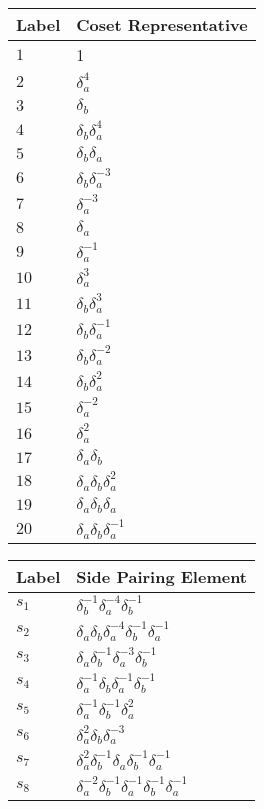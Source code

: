 \documentclass{article}
\begin{document}
\begin{center}
\begin{tabular}{ll}
\toprule
Label & Coset Representative\\
\midrule
$1$ & 1 \\
$2$ & $\delta_a^{4}$ \\
$3$ & $\delta_b^{}$ \\
$4$ & $\delta_b^{}\delta_a^{4}$ \\
$5$ & $\delta_b^{}\delta_a^{}$ \\
$6$ & $\delta_b^{}\delta_a^{-3}$ \\
$7$ & $\delta_a^{-3}$ \\
$8$ & $\delta_a^{}$ \\
$9$ & $\delta_a^{-1}$ \\
$10$ & $\delta_a^{3}$ \\
$11$ & $\delta_b^{}\delta_a^{3}$ \\
$12$ & $\delta_b^{}\delta_a^{-1}$ \\
$13$ & $\delta_b^{}\delta_a^{-2}$ \\
$14$ & $\delta_b^{}\delta_a^{2}$ \\
$15$ & $\delta_a^{-2}$ \\
$16$ & $\delta_a^{2}$ \\
$17$ & $\delta_a^{}\delta_b^{}$ \\
$18$ & $\delta_a^{}\delta_b^{}\delta_a^{2}$ \\
$19$ & $\delta_a^{}\delta_b^{}\delta_a^{}$ \\
$20$ & $\delta_a^{}\delta_b^{}\delta_a^{-1}$ \\
\bottomrule
\end{tabular}
\hfill
\begin{tabular}{ll}
\toprule
Label & Side Pairing Element\\
\midrule
$s_{1}$ & $\delta_b^{-1}\delta_a^{-4}\delta_b^{-1}$ \\
$s_{2}$ & $\delta_a^{}\delta_b^{}\delta_a^{-4}\delta_b^{-1}\delta_a^{-1}$ \\
$s_{3}$ & $\delta_a^{}\delta_b^{-1}\delta_a^{-3}\delta_b^{-1}$ \\
$s_{4}$ & $\delta_a^{-1}\delta_b^{}\delta_a^{-1}\delta_b^{-1}$ \\
$s_{5}$ & $\delta_a^{-1}\delta_b^{-1}\delta_a^{2}$ \\
$s_{6}$ & $\delta_a^{2}\delta_b^{}\delta_a^{-3}$ \\
$s_{7}$ & $\delta_a^{2}\delta_b^{-1}\delta_a^{}\delta_b^{-1}\delta_a^{-1}$ \\
$s_{8}$ & $\delta_a^{-2}\delta_b^{-1}\delta_a^{-1}\delta_b^{-1}\delta_a^{-1}$ \\

\end{tabular}
\end{center}
\end{document}
